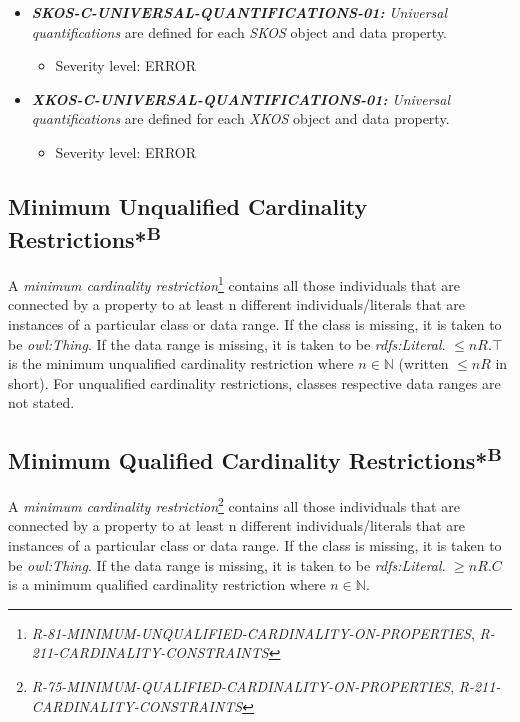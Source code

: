 \documentclass{llncs}
\begin{document}
\begin{itemize}
	\item \textbf{{\em SKOS-C-UNIVERSAL-QUANTIFICATIONS-01:}}
	\emph{Universal quantifications} are defined for each \emph{SKOS} object and data property.
	\begin{itemize}
		\item Severity level: ERROR
	\end{itemize}
\end{itemize}

\begin{itemize}
	\item \textbf{{\em XKOS-C-UNIVERSAL-QUANTIFICATIONS-01:}}
	\emph{Universal quantifications} are defined for each \emph{XKOS} object and data property.
	\begin{itemize}
		\item Severity level: ERROR
	\end{itemize}
\end{itemize}

\subsection{Minimum Unqualified Cardinality Restrictions*\textsuperscript{B}}

A \emph{minimum cardinality restriction}\footnote{{\em R-81-MINIMUM-UNQUALIFIED-CARDINALITY-ON-PROPERTIES}, {\em R-211-CARDINALITY-CONSTRAINTS}} contains all those individuals that are connected by a property to at least n different individuals/literals 
that are instances of a particular class or data range. If the class is missing, it is taken to be \emph{owl:Thing}. 
If the data range is missing, it is taken to be \emph{rdfs:Literal}.
$\leq n R. \top$ is the minimum unqualified cardinality restriction where $n \in \mathbb{N}$ (written $\leq  n R$ in short).
For unqualified cardinality restrictions, classes respective data ranges are not stated.

\subsection{Minimum Qualified Cardinality Restrictions*\textsuperscript{B}}

A \emph{minimum cardinality restriction}\footnote{{\em R-75-MINIMUM-QUALIFIED-CARDINALITY-ON-PROPERTIES}, {\em R-211-CARDINALITY-CONSTRAINTS}} contains all those individuals that are connected by a property to at least n different individuals/literals 
that are instances of a particular class or data range. If the class is missing, it is taken to be \emph{owl:Thing}. 
If the data range is missing, it is taken to be \emph{rdfs:Literal}.
$\geq n R. C$ is a minimum qualified cardinality restriction where $n \in \mathbb{N}$.
\end{document}
